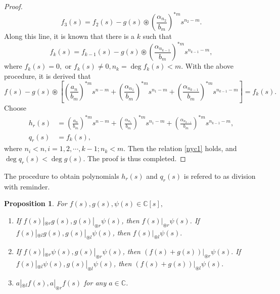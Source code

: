 \documentclass[12pt,a4paper,fleqn,twoside]{article}
\newtheorem{proposition}{Proposition}
\theoremstyle{plain}
\begin{document}
\begin{proof}
		\[f_3(s)=f_2(s)-g(s)\circledast \left(\frac{\alpha_{n_{2}}}{b_m}\right)^{*m}s^{n_2-m}.\]
		Along this line, it is known that there is a $k$ such that
		\[f_k(s)=f_{k-1}(s)-g(s)\circledast \left(\frac{\alpha_{n_{k-1}}}{b_m}\right)^{*m}s^{n_{k-1}-m},\]
		where $f_k(s)=0,$ or $f_k(s)\neq 0,n_k =\deg f_k(s)<m.$ With the above procedure, it is derived that 
		\[f(s)-g(s)\circledast \left[\left(\frac{a_n}{b_m}\right)^{*m}s^{n-m}+\left(\frac{\alpha_{n_{1}}}{b_m}\right)^{*m}s^{n_1-m}+\left(\frac{\alpha_{n_{k-1}}}{b_m}\right)^{*m}s^{n_{k-1}-m}\right]=f_k(s).\]
		Choose 
		\begin{align*}
			h_r(s)&=\left(\frac{a_n}{b_m}\right)^{*m}s^{n-m}+\left(\frac{\alpha_{n_{1}}}{b_m}\right)^{*m}s^{n_1-m}+\left(\frac{\alpha_{n_{k-1}}}{b_m}\right)^{*m}s^{n_{k-1}-m},\\q_r(s)&=f_k(s),
		\end{align*}
		where $n_i < n, i=1,2,\cdots, k-1; n_k < m.$ Then the relation \eqref{nyc1} holds, and $\deg q_r(s) < \deg g(s).$ The proof is thus completed.
	\end{proof}
	The procedure to obtain polynomials $h_r(s)$ and $q_r(s)$ is refered to as division with reminder.
	\begin{proposition}
		For $f(s),g(s), \psi(s) \in \mathbb{C}[s],$
		\begin{enumerate}[\normalfont (1)]
			\item If $f(s)|_{\circledast r}g(s),g(s)|_{\circledast r}\psi(s)$, then $f(s)|_{\circledast r}\psi(s)$. If $f(s)|_{\circledast l}g(s),g(s)|_{\circledast l}\psi(s)$, then $f(s)|_{\circledast l}\psi(s).$
			\item If $f(s)|_{\circledast r}\psi(s),g(s)|_{\circledast r}\psi(s)$, then $(f(s)+g(s))|_{\circledast r}\psi(s).$ If $f(s)|_{\circledast l}\psi(s),g(s)|_{\circledast l}\psi(s)$, then $(f(s)+g(s))|_{\circledast l}\psi(s).$
			\item $a|_{\circledast l}f(s),a|_{\circledast r}f(s)$ for any $a \in \mathbb{C}$.
		\end{enumerate}
	\end{proposition}
\end{document}
